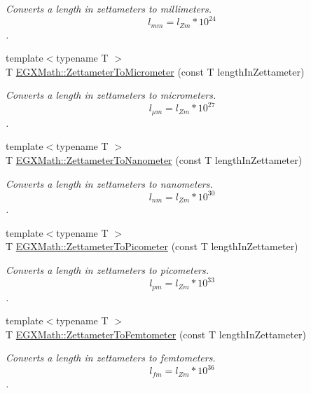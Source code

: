 \begin{DoxyCompactItemize}
\begin{DoxyCompactList}\small\item\em Converts a length in zettameters to millimeters. \[ l_{mm}=l_{Zm} * 10^{24} \]. \end{DoxyCompactList}\item 
{\footnotesize template$<$typename T $>$ }\\T \mbox{\hyperlink{group___e_g_x_math-_conversions-_length_conversions-_zettameter-_s_i_ga495f68a50945d994b3f2d455b3348595}{E\+G\+X\+Math\+::\+Zettameter\+To\+Micrometer}} (const T length\+In\+Zettameter)
\begin{DoxyCompactList}\small\item\em Converts a length in zettameters to micrometers. \[ l_{\mu m}=l_{Zm} * 10^{27} \]. \end{DoxyCompactList}\item 
{\footnotesize template$<$typename T $>$ }\\T \mbox{\hyperlink{group___e_g_x_math-_conversions-_length_conversions-_zettameter-_s_i_ga07934308bcd823e960e1c4be504e5afd}{E\+G\+X\+Math\+::\+Zettameter\+To\+Nanometer}} (const T length\+In\+Zettameter)
\begin{DoxyCompactList}\small\item\em Converts a length in zettameters to nanometers. \[ l_{nm}=l_{Zm} * 10^{30} \]. \end{DoxyCompactList}\item 
{\footnotesize template$<$typename T $>$ }\\T \mbox{\hyperlink{group___e_g_x_math-_conversions-_length_conversions-_zettameter-_s_i_gae7835234c6727bbfd1e9ad40c54a4740}{E\+G\+X\+Math\+::\+Zettameter\+To\+Picometer}} (const T length\+In\+Zettameter)
\begin{DoxyCompactList}\small\item\em Converts a length in zettameters to picometers. \[ l_{pm}=l_{Zm} * 10^{33} \]. \end{DoxyCompactList}\item 
{\footnotesize template$<$typename T $>$ }\\T \mbox{\hyperlink{group___e_g_x_math-_conversions-_length_conversions-_zettameter-_s_i_ga9af7bed274fea1c279796cd6113e79c4}{E\+G\+X\+Math\+::\+Zettameter\+To\+Femtometer}} (const T length\+In\+Zettameter)
\begin{DoxyCompactList}\small\item\em Converts a length in zettameters to femtometers. \[ l_{fm}=l_{Zm} * 10^{36} \]. \end{DoxyCompactList}\item 

\end{DoxyCompactItemize}
